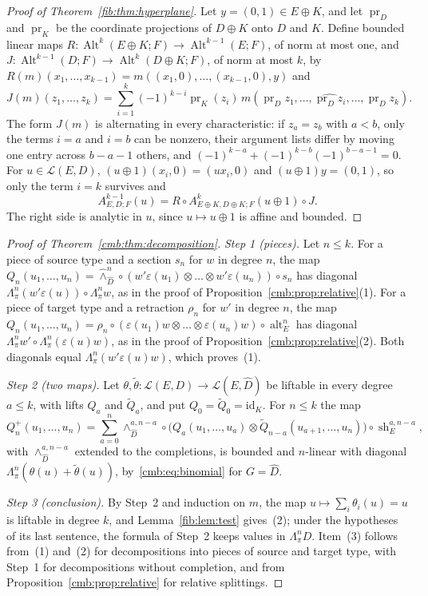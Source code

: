 \documentclass[11pt]{amsart}
\theoremstyle{definition}
\theoremstyle{remark}
\numberwithin{equation}{section}
\newcommand{\cL}{\mathcal L}
\newcommand{\Alt}{\operatorname{Alt}}
\newcommand{\id}{\mathrm{id}}
\theoremstyle{plain}
\theoremstyle{definition}
\theoremstyle{plain}
\newcommand{\alt}{\operatorname{alt}}
\begin{document}
\begin{proof}[Proof of Theorem~\ref{fib:thm:hyperplane}]
Let $y=(0,1)\in E\oplus K$, and let $\operatorname{pr}_D$ and $\operatorname{pr}_K$ be the coordinate projections of
$D\oplus K$ onto $D$ and $K$. Define bounded linear maps $R\colon\Alt^k(E\oplus K;F)\to\Alt^{k-1}(E;F)$, of norm at most
one, and $J\colon\Alt^{k-1}(D;F)\to\Alt^k(D\oplus K;F)$, of norm at most $k$, by
$R(m)(x_1,\dots,x_{k-1})=m((x_1,0),\dots,(x_{k-1},0),y)$ and
\[
 J(m)(z_1,\dots,z_k)=\sum_{i=1}^k(-1)^{k-i}\operatorname{pr}_K(z_i)\,
 m(\operatorname{pr}_Dz_1,\dots,\widehat{\operatorname{pr}_Dz_i},\dots,\operatorname{pr}_Dz_k).
\]
The form $J(m)$ is alternating in every characteristic: if $z_a=z_b$ with $a<b$, only the terms $i=a$ and $i=b$ can be
nonzero, their argument lists differ by moving one entry across $b-a-1$ others, and
$(-1)^{k-a}+(-1)^{k-b}(-1)^{b-a-1}=0$. For $u\in\cL(E,D)$, $(u\oplus1)(x_i,0)=(ux_i,0)$ and $(u\oplus1)y=(0,1)$, so only
the term $i=k$ survives and
\[
 A^{k-1}_{E,D;F}(u)=R\circ A^k_{E\oplus K,D\oplus K;F}(u\oplus1)\circ J.
\]
The right side is analytic in $u$, since $u\mapsto u\oplus1$ is affine and bounded.
\end{proof}

\begin{proof}[Proof of Theorem~\ref{cmb:thm:decomposition}]
\emph{Step 1 (pieces).} Let $n\le k$. For a piece of source type and a section $s_n$ for $w$ in degree $n$, the map
$Q_n(u_1,\dots,u_n)=\widehat\wedge^n_{\widehat D}\circ(w'\varepsilon(u_1)\otimes\dots\otimes w'\varepsilon(u_n))\circ s_n$
has diagonal $\Lambda^n_\pi(w'\varepsilon(u))\circ\Lambda^n_\pi w$, as in the proof of
Proposition~\ref{cmb:prop:relative}(1). For a piece of target type and a retraction $\rho_n$ for $w'$ in degree $n$, the
map $Q_n(u_1,\dots,u_n)=\rho_n\circ(\varepsilon(u_1)w\otimes\dots\otimes\varepsilon(u_n)w)\circ\alt^n_E$ has diagonal
$\Lambda^n_\pi w'\circ\Lambda^n_\pi(\varepsilon(u)w)$, as in the proof of Proposition~\ref{cmb:prop:relative}(2). Both
diagonals equal $\Lambda^n_\pi(w'\varepsilon(u)w)$, which proves~(1).

\emph{Step 2 (two maps).} Let $\theta,\tilde\theta\colon\cL(E,D)\to\cL(E,\widehat D)$ be liftable in every degree
$a\le k$, with lifts $Q_a$ and $\tilde Q_a$, and put $Q_0=\tilde Q_0=\id_K$. For $n\le k$ the map
\[
 Q^+_n(u_1,\dots,u_n)=\sum_{a=0}^n\wedge^{a,n-a}_{\widehat D}\circ\bigl(Q_a(u_1,\dots,u_a)\otimes
 \tilde Q_{n-a}(u_{a+1},\dots,u_n)\bigr)\circ\operatorname{sh}^{a,n-a}_E ,
\]
with $\wedge^{a,n-a}_{\widehat D}$ extended to the completions, is bounded and $n$-linear with diagonal
$\Lambda^n_\pi(\theta(u)+\tilde\theta(u))$, by~\eqref{cmb:eq:binomial} for $G=\widehat D$.

\emph{Step 3 (conclusion).} By Step~2 and induction on $m$, the map $u\mapsto\sum_i\theta_i(u)=u$ is liftable in degree
$k$, and Lemma~\ref{fib:lem:test} gives~(2); under the hypotheses of its last sentence, the formula of Step~2 keeps values
in $\Lambda^n_\pi D$. Item~(3) follows from~(1) and~(2) for decompositions into pieces of source and target type, with
Step~1 for decompositions without completion, and from Proposition~\ref{cmb:prop:relative} for relative splittings.
\end{proof}
\end{document}
